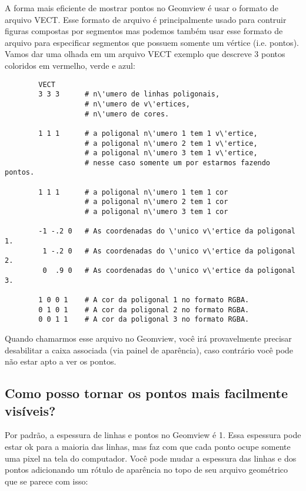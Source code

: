 \documentclass[12pt,a4paper]{article}
\begin{document}
        A forma mais eficiente de mostrar pontos no Geomview \'e usar o formato de
        arquivo VECT. Esse formato de arquivo \'e principalmente usado para contruir figuras compostas
        por segmentos mas podemos tamb\'em usar esse formato de arquivo para especificar segmentos que possuem somente
        um v\'ertice (i.e. pontos). Vamos dar uma olhada em um arquivo VECT exemplo que
        descreve 3 pontos coloridos em vermelho, verde e azul:
	\tiny
        \begin{verbatim}
        VECT
        3 3 3      # n\'umero de linhas poligonais,
                   # n\'umero de v\'ertices,
                   # n\'umero de cores.

        1 1 1      # a poligonal n\'umero 1 tem 1 v\'ertice,
                   # a poligonal n\'umero 2 tem 1 v\'ertice,
                   # a poligonal n\'umero 3 tem 1 v\'ertice,
                   # nesse caso somente um por estarmos fazendo pontos.

        1 1 1      # a poligonal n\'umero 1 tem 1 cor
                   # a poligonal n\'umero 2 tem 1 cor
                   # a poligonal n\'umero 3 tem 1 cor

        -1 -.2 0   # As coordenadas do \'unico v\'ertice da poligonal 1.
         1 -.2 0   # As coordenadas do \'unico v\'ertice da poligonal 2.
         0  .9 0   # As coordenadas do \'unico v\'ertice da poligonal 3.

        1 0 0 1    # A cor da poligonal 1 no formato RGBA.
        0 1 0 1    # A cor da poligonal 2 no formato RGBA.
        0 0 1 1    # A cor da poligonal 3 no formato RGBA.
        \end{verbatim}
        \normalsize
        Quando chamarmos esse arquivo no Geomview, voc\^e ir\'a provavelmente precisar desabilitar
        a caixa associada (via painel de apar\^encia), caso contr\'ario voc\^e pode n\~ao
        estar apto a ver os pontos.

    \subsection{Como posso tornar os pontos mais facilmente \newline vis\'iveis?}

        Por padr\~ao, a espessura de linhas e pontos no Geomview \'e 1. Essa espessura pode
        estar ok para a maioria das linhas, mas faz com que cada ponto ocupe somente uma
        pixel na tela do computador. Voc\^e pode mudar a espessura das linhas e dos pontos
        adicionando um r\'{o}tulo de apar\^encia no topo de seu arquivo geom\'etrico que se parece
        com isso:
\end{document}
